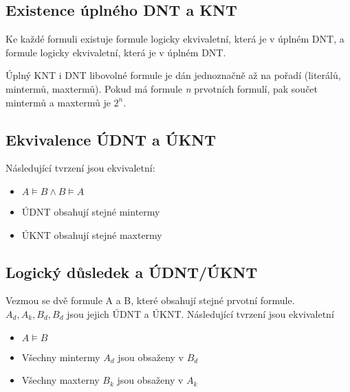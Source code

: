 \documentclass{szzclass}
\begin{document}
\subsection{Existence úplného DNT a KNT}
Ke každé formuli existuje formule logicky ekvivaletní, která je v úplném DNT, a formule logicky ekvivaletní, která je v úplném DNT.

Úplný KNT i DNT libovolné formule je dán jednoznačně až na pořadí (literálů, mintermů, maxtermů). Pokud má formule \textit{n} prvotních
formulí, pak součet mintermů a maxtermů je $2^n$.
\subsection{Ekvivalence ÚDNT a ÚKNT}
Následující tvrzení jsou ekvivaletní:
\begin{itemize}
	\item $A \models B \wedge B \models A$
	\item ÚDNT obsahují stejné mintermy
	\item ÚKNT obsahují stejné maxtermy
\end{itemize}
\subsection{Logický důsledek a ÚDNT/ÚKNT}
Vezmou se dvě formule A a B, které obsahují stejné prvotní formule. $A_d, A_k, B_d, B_d$ jsou jejich ÚDNT a ÚKNT.
Následující tvrzení jsou ekvivaletní
\begin{itemize}
	\item $A \models B$
	\item Všechny mintermy $A_d$ jsou obsaženy v $B_d$
	\item Všechny maxterny $B_k$ jsou obsaženy v $A_k$ 
\end{itemize}
\end{document}
